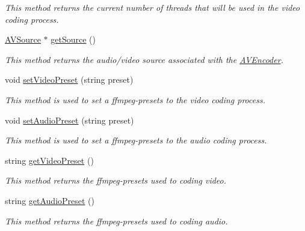 \begin{DoxyCompactItemize}
\begin{DoxyCompactList}\small\item\em This method returns the current number of threads that will be used in the video coding process. \item\end{DoxyCompactList}\item 
\hyperlink{classbr_1_1ufscar_1_1lince_1_1xpta_1_1streaming_1_1AVSource}{AVSource} $\ast$ \hyperlink{classbr_1_1ufscar_1_1lince_1_1xpta_1_1streaming_1_1AVEncoder_a63118f2d7a9b3631eceb04cbd9a59eb1}{getSource} ()
\begin{DoxyCompactList}\small\item\em This method returns the audio/video source associated with the \hyperlink{classbr_1_1ufscar_1_1lince_1_1xpta_1_1streaming_1_1AVEncoder}{AVEncoder}. \item\end{DoxyCompactList}\item 
void \hyperlink{classbr_1_1ufscar_1_1lince_1_1xpta_1_1streaming_1_1AVEncoder_aa9e6c923f02cfcdd8bc8c179bb87bcdb}{setVideoPreset} (string preset)
\begin{DoxyCompactList}\small\item\em This method is used to set a ffmpeg-\/presets to the video coding process. \item\end{DoxyCompactList}\item 
void \hyperlink{classbr_1_1ufscar_1_1lince_1_1xpta_1_1streaming_1_1AVEncoder_a65d94849c6d727a0612d6db3909e7abe}{setAudioPreset} (string preset)
\begin{DoxyCompactList}\small\item\em This method is used to set a ffmpeg-\/presets to the audio coding process. \item\end{DoxyCompactList}\item 
string \hyperlink{classbr_1_1ufscar_1_1lince_1_1xpta_1_1streaming_1_1AVEncoder_aeb8d6031685e79ce0e8bc4a4b9e6e8fb}{getVideoPreset} ()
\begin{DoxyCompactList}\small\item\em This method returns the ffmpeg-\/presets used to coding video. \item\end{DoxyCompactList}\item 
string \hyperlink{classbr_1_1ufscar_1_1lince_1_1xpta_1_1streaming_1_1AVEncoder_a70813888818b9827e95f3fc19facf2b4}{getAudioPreset} ()
\begin{DoxyCompactList}\small\item\em This method returns the ffmpeg-\/presets used to coding audio. \item\end{DoxyCompactList}\item 

\end{DoxyCompactItemize}
